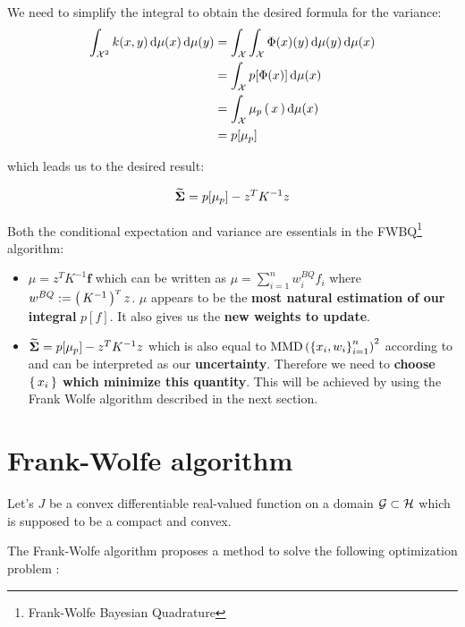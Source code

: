 \begin{boxcomputation}
  We need to simplify the integral to obtain the desired formula for the variance:
\begin{align*}
  \int_{\mathcal{X}^2}  k(x,y) \mathop{}\mathopen{}\mathrm{d} \mu(x) \mathop{}\mathopen{}\mathrm{d} \mu(y) &= \int_{\mathcal{X}} \int_{\mathcal{X}} \Phi(x)(y) \mathop{}\mathopen{}\mathrm{d} \mu(y) \mathop{}\mathopen{}\mathrm{d} \mu(x) \\
  &= \int_{\mathcal{X}} p[\Phi(x)] \mathop{}\mathopen{}\mathrm{d} \mu(x) \\
  &= \int_{\mathcal{X}} \mu_p\left( \, x \, \right) \mathop{}\mathopen{}\mathrm{d} \mu(x) \\
  &=  p[\mu_p]
\end{align*}
\end{boxcomputation}
which leads us to the desired result:
\begin{boxtheorem}
  $$\mathbf{\widetilde{\Sigma}} = p[\mu_p] -z ^ { T } K ^ { - 1 } z$$
\end{boxtheorem}

Both the conditional expectation and variance are essentials in the FWBQ\footnote{Frank-Wolfe Bayesian Quadrature} algorithm:
\begin{itemize}[font= \color{blue} \large, label= $\bullet$]
  \item $\mu = z ^ { T } K ^ { - 1 } \mathbf { f }$ which can be written as
  $\displaystyle \mu = \sum_{i=1}^n w_i^{BQ} f_i$ where $w^{BQ} := \left( \, K^{-1} \, \right)^{\scriptscriptstyle T}z$. $\mu$ appears to be the \textbf{most natural estimation of our integral} $p[f]$.
  It also gives us the \textbf{new weights to update}.
  \item $\mathbf{\widetilde{\Sigma}} = p[\mu_p] -z ^ { T } K ^ { - 1 } z$ which is also equal to $\operatorname { MMD } \left( \left\{ x _ { i } , w _ { i } \right\} _ { i = 1 } ^ { n } \right)^2$
  according to \cite{huszar} and can be interpreted as our \textbf{uncertainty}. Therefore
  we need to \textbf{choose $\left \{ \, x_i \, \right \}$ which minimize this quantity}. This will be achieved
  by using the Frank Wolfe algorithm described in the next section.
\end{itemize}


\section{Frank-Wolfe algorithm}
\label{sec:FW}

Let's $J$ be a convex differentiable real-valued function on a
domain $\mathcal{G}\subset\mathcal{H}$ which is supposed to be a compact and convex.

The Frank-Wolfe algorithm \cite{fwalgo} proposes a method to solve the following optimization
 problem :

